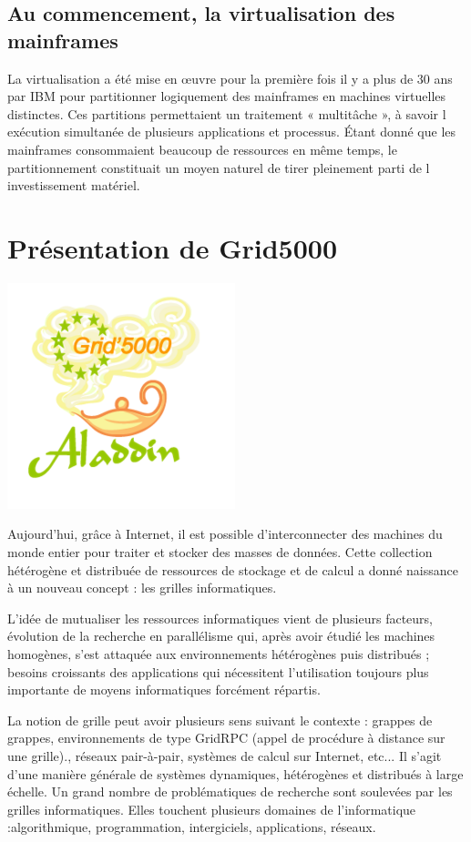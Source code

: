 \subsection{Au commencement, la virtualisation des mainframes}

La virtualisation a été mise en œuvre pour la première fois il y
a plus de 30 ans par IBM pour partitionner logiquement des mainframes
en machines virtuelles distinctes. Ces partitions permettaient un
traitement « multitâche », à savoir l exécution simultanée de plusieurs applications et processus. Étant donné que les mainframes consommaient beaucoup de ressources en même temps, le partitionnement
constituait un moyen naturel de tirer pleinement parti de l investissement matériel.

\section{Présentation de Grid5000}
\includegraphics{images/logo.png}

Aujourd’hui, grâce à Internet, il est possible
d’interconnecter des machines du monde entier pour
traiter et stocker des masses de données. Cette collection
hétérogène et distribuée de ressources de stockage et de
calcul a donné naissance à un nouveau concept : les
grilles informatiques.

L’idée de mutualiser les ressources
informatiques vient de plusieurs facteurs, évolution de la
recherche en parallélisme qui, après avoir étudié les
machines homogènes, s’est attaquée aux environnements
hétérogènes puis distribués ; besoins croissants des
applications qui nécessitent l’utilisation toujours plus
importante de moyens informatiques forcément répartis.

La notion de grille peut avoir plusieurs sens suivant le
contexte : grappes de grappes, environnements de type
GridRPC (appel de procédure à distance sur une grille).,
réseaux pair-à-pair, systèmes de calcul sur Internet, etc...
Il s’agit d’une manière générale de systèmes dynamiques,
hétérogènes et distribués à large échelle. Un grand
nombre de problématiques de recherche sont soulevées
par les grilles informatiques. Elles touchent plusieurs
domaines de l’informatique :algorithmique,
programmation, intergiciels, applications, réseaux.

